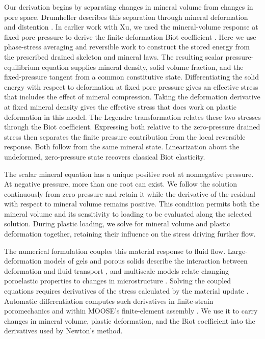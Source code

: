 Our derivation begins by separating changes in mineral volume from changes
in pore space.  Drumheller describes this separation through mineral
deformation and distention \citep{drumheller2000}.  In earlier work with
Xu, we used the mineral-volume response at fixed pore pressure to derive
the finite-deformation Biot coefficient \citep{fosterxu2025}.  Here we
use phase-stress averaging and reversible work to construct the stored
energy from the prescribed drained skeleton and mineral laws.  The resulting
scalar pressure-equilibrium equation supplies mineral density, solid volume
fraction, and the fixed-pressure tangent from a common constitutive state.
Differentiating the solid energy with respect to deformation at fixed pore
pressure gives an effective stress that includes the effect of mineral
compression.  Taking the deformation derivative at fixed mineral density
gives the effective stress that does work on plastic deformation in this
model.  The Legendre transformation relates these two stresses through the
Biot coefficient.  Expressing both relative to the zero-pressure drained
stress then separates the finite pressure contribution from the local
reversible response.  Both follow from the same mineral state.
Linearization about the undeformed, zero-pressure state recovers classical
Biot elasticity.

The scalar mineral equation has a unique positive root at nonnegative
pressure.  At negative pressure, more than one root can exist.  We follow
the solution continuously from zero pressure and retain it while the
derivative of the residual with respect to mineral volume remains positive.
This condition permits both the mineral volume and its sensitivity to
loading to be evaluated along the selected solution.
During plastic loading, we solve for mineral volume and plastic deformation
together, retaining their influence on the stress driving further flow.

The numerical formulation couples this material response to fluid flow.
Large-deformation models of gels and porous solids describe the interaction
between deformation and fluid transport \citep{hongetal2008,macminnetal2016},
and multiscale models relate changing poroelastic properties to changes in
microstructure \citep{dehghanizilian2021}.  Solving the coupled equations
requires derivatives of the stress calculated by the material update
\citep{simotaylor1985,miehe1996}.  Automatic differentiation computes such
derivatives in finite-strain poromechanics \citep{sunostien2013} and within
MOOSE's finite-element assembly \citep{lindsayetal2021ad}.  We use it to
carry changes in mineral volume, plastic deformation, and the Biot
coefficient into the derivatives used by Newton's method.

